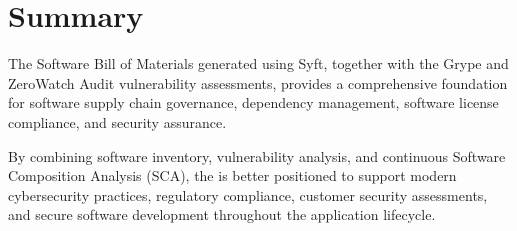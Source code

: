 \vspace{0.4cm}


\section{Summary}

The Software Bill of Materials generated using Syft, together with the Grype and ZeroWatch Audit vulnerability assessments, provides a comprehensive foundation for software supply chain governance, dependency management, software license compliance, and security assurance.

By combining software inventory, vulnerability analysis, and continuous Software Composition Analysis (SCA), the \textbf{\ProjectName} is better positioned to support modern cybersecurity practices, regulatory compliance, customer security assessments, and secure software development throughout the application lifecycle.